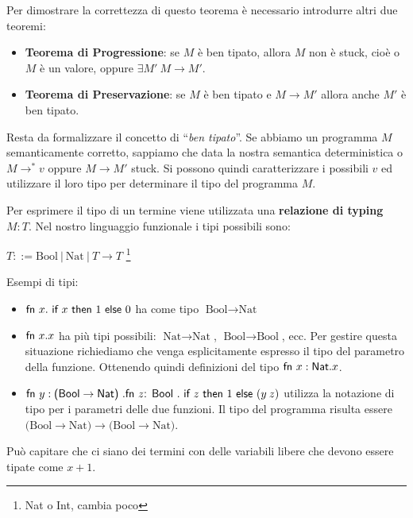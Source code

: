 \noindent Per dimostrare la correttezza di questo teorema è necessario introdurre altri due teoremi:

\begin{itemize}
	\item \textbf{Teorema di Progressione}: se $M$ è ben tipato, allora $M$ non è stuck, cioè o $M$ è un valore, oppure $\exists M' \: M \rightarrow M'$.
	\item \textbf{Teorema di Preservazione}: se $M$ è ben tipato e $M \rightarrow M'$ allora anche $M'$ è ben tipato.
\end{itemize}

\noindent Resta da formalizzare il concetto di ``\textit{ben tipato}''.
Se abbiamo un programma $M$ semanticamente corretto, sappiamo che data la nostra semantica deterministica o $M \rightarrow^* v$ oppure $M \rightarrow M' $ stuck.
Si possono quindi caratterizzare i possibili $v$ ed utilizzare il loro tipo per determinare il tipo del programma $M$.

Per esprimere il tipo di un termine viene utilizzata una \textbf{relazione di typing} $M : T$.
Nel nostro linguaggio funzionale i tipi possibili sono:

\begin{center}
$
T ::= \text{Bool} \:|\: \text{Nat} \:|\: T \rightarrow T
$ \footnote{Nat o Int, cambia poco}
\end{center}

\noindent Esempi di tipi:
\begin{itemize}
	\item $\fn x.\iif x \then 1 \eelse 0$ ha come tipo $\text{Bool} \rightarrow \text{Nat}$
	\item $\fn x.x$ ha più tipi possibili: $\text{Nat} \rightarrow \text{Nat}$, $\text{Bool} \rightarrow \text{Bool}$, ecc. Per gestire questa situazione richiediamo che venga esplicitamente espresso il tipo del parametro della funzione. Ottenendo quindi definizioni del tipo $\fn x : \text{Nat} .x$.
	\item $\fn y : \text{(Bool} \rightarrow \text{Nat) } . \fn z \text{: Bool }.\iif z \then 1 \eelse (y \: z)$ utilizza la notazione di tipo per i parametri delle due funzioni. Il tipo del programma risulta essere $\text{(Bool}\rightarrow \text{Nat)} \rightarrow \text{(Bool}\rightarrow \text{Nat)}$.
\end{itemize}

\noindent Può capitare che ci siano dei termini con delle variabili libere che devono essere tipate come $x + 1$.

